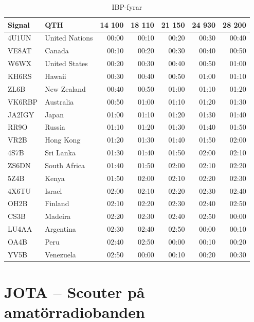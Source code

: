 \begin{table}[H]
\centering
\begin{tabular}{llrrrrr}
\textbf{Signal} & \textbf{QTH} & \textbf{14 100} & \textbf{18 110} &
                \textbf{21 150} & \textbf{24 930} & \textbf{28 200} \\ \hline
4U1UN  & United Nations & 00:00  & 00:10  & 00:20  & 00:30  & 00:40  \\
VE8AT  & Canada         & 00:10  & 00:20  & 00:30  & 00:40  & 00:50  \\
W6WX   & United States  & 00:20  & 00:30  & 00:40  & 00:50  & 01:00  \\
KH6RS  & Hawaii         & 00:30  & 00:40  & 00:50  & 01:00  & 01:10  \\
ZL6B   & New Zealand    & 00:40  & 00:50  & 01:00  & 01:10  & 01:20  \\
VK6RBP & Australia      & 00:50  & 01:00  & 01:10  & 01:20  & 01:30  \\
JA2IGY & Japan          & 01:00  & 01:10  & 01:20  & 01:30  & 01:40  \\
RR9O   & Russia         & 01:10  & 01:20  & 01:30  & 01:40  & 01:50  \\
VR2B   & Hong Kong      & 01:20  & 01:30  & 01:40  & 01:50  & 02:00  \\
4S7B   & Sri Lanka      & 01:30  & 01:40  & 01:50  & 02:00  & 02:10  \\
ZS6DN  & South Africa   & 01:40  & 01:50  & 02:00  & 02:10  & 02:20  \\
5Z4B   & Kenya          & 01:50  & 02:00  & 02:10  & 02:20  & 02:30  \\
4X6TU  & Israel         & 02:00  & 02:10  & 02:20  & 02:30  & 02:40  \\
OH2B   & Finland        & 02:10  & 02:20  & 02:30  & 02:40  & 02:50  \\
CS3B   & Madeira        & 02:20  & 02:30  & 02:40  & 02:50  & 00:00  \\
LU4AA  & Argentina      & 02:30  & 02:40  & 02:50  & 00:00  & 00:10  \\
OA4B   & Peru           & 02:40  & 02:50  & 00:00  & 00:10  & 00:20  \\
YV5B   & Venezuela      & 02:50  & 00:00  & 00:10  & 00:20  & 00:30  \\
\end{tabular}
\caption{IBP-fyrar}
\end{table}

\normalsize

\section{JOTA -- Scouter på amatörradiobanden}

